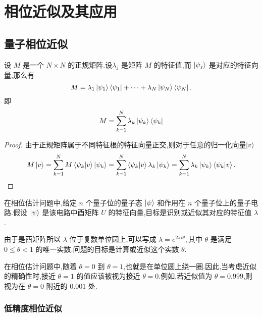 \chapter{相位近似及其应用}

\section{量子相位近似}

\begin{theorem}[谱分解]
设 $ M $ 是一个 $ N \times N $ 的正规矩阵.设$\lambda_j $ 是矩阵 $M$ 的特征值,而 $\ket{\psi_j} $ 是对应的特征向量,那么有
\begin{equation}
M = \lambda_1 \ket{\psi_1}\bra{\psi_1} + \cdots + \lambda_N \ket{\psi_N}\bra{\psi_N}.
\end{equation}
即
\begin{equation}
M = \sum_{k=1}^{N} \lambda_k \ket{\psi_k}\bra{\psi_k} 
\end{equation}
\end{theorem}

\begin{proof}

由于正规矩阵属于不同特征根的特征向量正交,则对于任意的归一化向量$\ket{v}$ 
$$
M \ket{v} = \sum_{k=1}^{N} M \braket{\psi_k | v}  \ket{\psi_k} = \sum_{k=1}^{N} \braket{\psi_k | v} \lambda_k \ket{\psi_k}=\sum_{k=1}^{N} \lambda_k \ket{\psi_k} \braket{\psi_k | v}.
$$
\end{proof}

在相位估计问题中,给定 $ n $ 个量子位的量子态 $ \ket{\psi} $ 和作用在 $ n $ 个量子位上的量子电路.假设 $ \ket{\psi} $ 是该电路中酉矩阵 $ U $ 的特征向量,目标是识别或近似其对应的特征值 $ \lambda $.

由于是酉矩阵所以 $ \lambda $ 位于复数单位圆上,可以写成
$\lambda = e^{2\pi i \theta},$其中 $ \theta $ 是满足 $ 0 \leq \theta < 1 $ 的唯一实数.问题的目标是计算或近似这个实数 $ \theta $.

\begin{explain}
在相位估计问题中,随着 $ \theta = 0 $ 到 $ \theta = 1 $,也就是在单位圆上绕一圈.因此,当考虑近似的精确性时,接近 $ \theta = 1 $ 的值应该被视为接近 $ \theta = 0 $.例如,若近似值为 $ \theta = 0.999 $,则视为在 $ \theta = 0 $ 附近的 $0.001 $ 处.
\end{explain}

\subsection{低精度相位近似}

